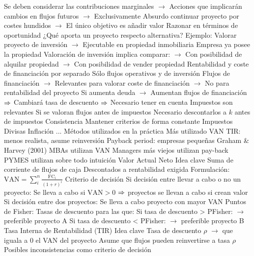 \documentclass{nuevotema}
\begin{document}
\begin{esquemal}
				\4 Se deben considerar las contribuciones marginales
				\4[] $\to$ Acciones que implicarán cambios en flujos futuros
				\4[] $\to$ Exclusivamente
				\4[] Absurdo continuar proyecto por costes hundidos
				\4[] $\to$ El único objetivo es añadir valor
			\3 Razonar en términos de oportunidad
				\4 ¿Qué aporta un proyecto respecto alternativa?
				\4 Ejemplo:
				\4[] Valorar proyecto de inversión
				\4[] $\to$ Ejecutable en propiedad inmobiliaria
				\4[] Empresa ya posee la propiedad
				\4[] Valoración de inversión implica comparar:
				\4[] $\to$ Con posibilidad de alquilar propiedad
				\4[] $\to$ Con posibilidad de vender propiedad
			\3 Rentabilidad y coste de financiación por separado
				\4 Sólo flujos operativos y de inversión
				\4 Flujos de financiación
				\4[] $\to$ Relevantes para valorar coste de financiación
				\4[] $\to$ No para rentabilidad del proyecto
				\4[] Si aumenta deuda
				\4[] $\to$ Aumentan flujos de financiación
				\4[] $\Rightarrow$ Cambiará tasa de descuento
				\4[] $\Rightarrow$ Necesario tener en cuenta
			\3 Impuestos son relevantes
				\4 Si se valoran flujos antes de impuestos
				\4[] Necesario descontarlos a $k$ antes de impuestos
			\3 Consistencia
				\4 Mantener criterios de forma constante
				\4[$\to$] Impuestos
				\4[$\to$] Divisas
				\4[$\to$] Inflación
				\4[$\to$] ...
			\3 Métodos utilizados en la práctica
				\4 Más utilizado VAN
				\4 TIR: menos realista, asume reinversión
				\4 Payback period: empresas pequeñas
				\4 Graham \& Harvey (2001)
				\4[] MBAs utilizan VAN
				\4[] Managers más viejos utilizan pay-back
				\4[] PYMES utilizan sobre todo intuición
		\2 Valor Actual Neto
			\3 Idea clave
				\4 Suma de corriente de flujos de caja
				\4[$\to$] Descontados a rentabilidad exigida
			\3 Formulación:
				\4[] $\text{VAN} = \sum_i^n \frac{\text{FC}_i}{(1+r)^i}$
			\3 Criterio de decisión
				\4 Si decisión entre llevar a cabo o no un proyecto:
				\4[] Se lleva a cabo si $\text{VAN} > 0$
				\4[] $\Rightarrow$ proyectos se llevan a cabo si crean valor
				\4 Si decisión entre dos proyectos:
				\4[] Se lleva a cabo proyecto con mayor VAN
				\4 Puntos de Fisher:
				\4[] Tasas de descuento para las que:
				\4[] Si tasa de descuento > PFisher:
				\4[] $\to$ preferible proyecto A
				\4[] Si tasa de descuento < PFisher:
				\4[] $\to$ preferible proyecto B
		\2 Tasa Interna de Rentabilidad (TIR)
			\3 Idea clave
				\4 Tasa de descuento $\rho$
				\4[] $\to$ que iguala a 0 el VAN del proyecto
				\4 Asume que flujos pueden reinvertirse a tasa $\rho$
				\4 Posibles inconsistencias como criterio de decisión

\end{esquemal}
\end{document}
